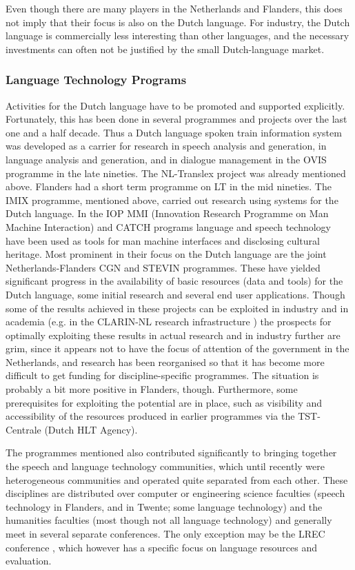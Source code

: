 \begin{multicols}{2}
    Even though there are many players in the Netherlands and Flanders, this does not imply that their focus is also on the Dutch language. For industry, the Dutch language is commercially less interesting than other languages, and the necessary investments can often not be justified by the small Dutch-language market.

\subsubsection{Language Technology Programs}

  Activities for the Dutch language have to be promoted and supported explicitly. Fortunately, this has been done in several programmes and projects over the last one and a half decade. Thus a Dutch language spoken train information system was developed as a carrier for research in speech analysis and generation, in language analysis and generation, and in dialogue management in the OVIS programme in the late nineties. The NL-Translex project was already mentioned above. Flanders had a short term programme on LT in the mid nineties. The IMIX programme, mentioned above, carried out research using systems for the Dutch language.  In the IOP MMI (Innovation Research Programme on Man Machine Interaction) and CATCH \cite{CATCH} programs language and speech technology have been used as tools for man machine interfaces and disclosing cultural heritage. Most prominent in their focus on the Dutch language are the joint Netherlands-Flanders CGN and STEVIN programmes. These have yielded significant progress in the availability of basic resources (data and tools) for the Dutch language, some initial research and several end user applications. Though some of the results achieved in these projects can be exploited in industry and in academia (e.g. in the CLARIN-NL research infrastructure \cite{CLARIN-NL} ) the prospects for optimally exploiting these results in actual research and in industry further are grim, since it appears not to have the focus of attention of the government in the Netherlands, and research has been reorganised so that it has become more difficult to get funding for discipline-specific programmes. The situation is probably a bit more positive in Flanders, though. Furthermore, some prerequisites for exploiting the potential are in place, such as visibility and accessibility of the resources produced in earlier programmes via the TST-Centrale (Dutch HLT Agency).

  The programmes mentioned also contributed significantly to bringing together the speech and language technology communities, which until recently were heterogeneous communities and operated quite separated from each other. These disciplines are distributed over computer or engineering science faculties (speech technology in Flanders, and in Twente; some language technology) and the humanities faculties (most though not all language technology) and generally meet in several separate conferences. The only exception may be the LREC conference \cite{LREC}, which however has a specific focus on language resources and evaluation.


\end{multicols}
